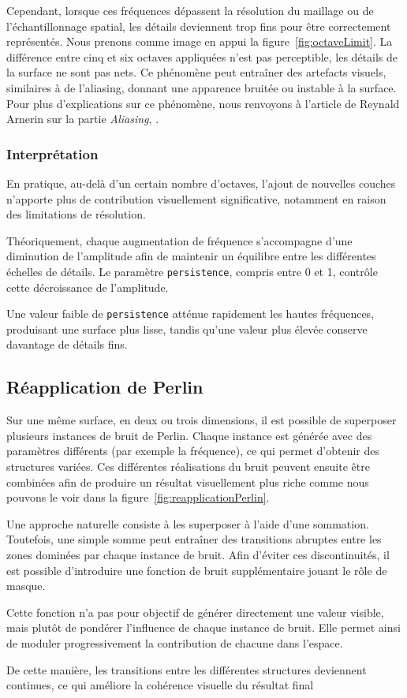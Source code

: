 Cependant, lorsque ces fréquences dépassent la résolution du maillage ou de l’échantillonnage spatial, les détails deviennent trop fins pour être correctement représentés.
Nous prenons comme image en appui la figure~\ref{fig:octaveLimit}.
La différence entre cinq et six octaves appliquées n'est pas perceptible, les détails de la surface ne sont pas nets.
Ce phénomène peut entraîner des artefacts visuels, similaires à de l’aliasing, donnant une apparence bruitée ou instable à la surface.
Pour plus d'explications sur ce phénomène, nous renvoyons à l'article de Reynald Arnerin sur la partie \textit{Aliasing}, \cite{AliasingArticle}.

\subsubsection{Interprétation}

En pratique, au-delà d’un certain nombre d’octaves, l’ajout de nouvelles couches n’apporte plus de contribution visuellement significative, notamment en raison des limitations de résolution.

Théoriquement, chaque augmentation de fréquence s’accompagne d’une diminution de l’amplitude afin de maintenir un équilibre entre les différentes échelles de détails.
Le paramètre \texttt{persistence}, compris entre 0 et 1, contrôle cette décroissance de l’amplitude.

Une valeur faible de \texttt{persistence} atténue rapidement les hautes fréquences, produisant une surface plus lisse, tandis qu’une valeur plus élevée conserve davantage de détails fins.

\subsection{Réapplication de Perlin}
\label{ReapplicationPerlin}

Sur une même surface, en deux ou trois dimensions, il est possible de superposer plusieurs instances de bruit de Perlin. 
Chaque instance est générée avec des paramètres différents (par exemple la fréquence), ce qui permet d’obtenir des structures variées. 
Ces différentes réalisations du bruit peuvent ensuite être combinées afin de produire un résultat visuellement plus riche comme nous pouvons le voir dans la figure~\ref{fig:reapplicationPerlin}.

Une approche naturelle consiste à les superposer à l’aide d’une sommation. 
Toutefois, une simple somme peut entraîner des transitions abruptes entre les zones dominées par chaque instance de bruit.
Afin d’éviter ces discontinuités, il est possible d’introduire une fonction de bruit supplémentaire jouant le rôle de masque.

Cette fonction n’a pas pour objectif de générer directement une valeur visible, mais plutôt de pondérer l’influence de chaque instance de bruit. 
Elle permet ainsi de moduler progressivement la contribution de chacune dans l’espace.

De cette manière, les transitions entre les différentes structures deviennent continues, ce qui améliore la cohérence visuelle du résultat final
